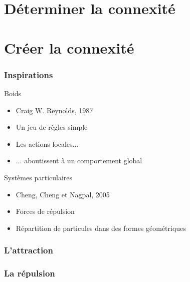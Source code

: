 \documentclass{beamer}
\begin{document}
\section{Déterminer la connexité}

\begin{frame}

\end{frame}

\section{Créer la connexité}

\begin{frame}

  \frametitle{Inspirations}

  \begin{block}{Boids}
    \begin{itemize}
    \item{Craig W. Reynolds, 1987}
    \item{Un jeu de règles simple}
    \item{Les actions locales...}
    \item{... aboutissent à un comportement global}
    \end{itemize}
  \end{block}

  \vfill

  \begin{block}{Systèmes particulaires}
    \begin{itemize}
    \item{Cheng, Cheng et Nagpal, 2005}
    \item{Forces de répulsion}
    \item{Répartition de particules dans des formes géométriques}
    \end{itemize}
  \end{block}

\end{frame}

\begin{frame}

  \frametitle{L'attraction}

  \begin{figure}
    
  \end{figure}

\end{frame}

\begin{frame}

  \frametitle{La répulsion}

  \begin{figure}
    
  \end{figure}

\end{frame}
\end{document}
